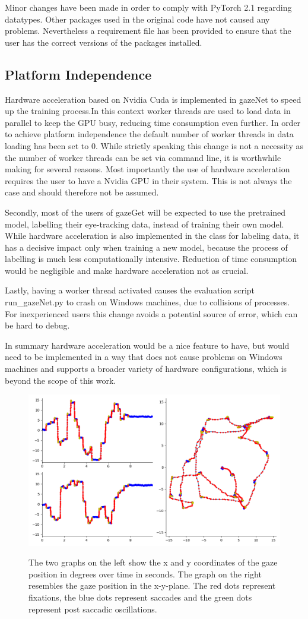 \documentclass[conference]{IEEEtran}
\begin{document}
Minor changes have been made in order to comply with PyTorch 2.1 regarding datatypes. Other packages used in the original code have not caused any problems. Nevertheless a requirement file has been provided to ensure that the user has the correct versions of the packages installed.

\subsection{Platform Independence}
Hardware acceleration based on Nvidia Cuda is implemented in gazeNet to speed up the training process.In this context worker threads are used to load data in parallel to keep the GPU busy, reducing time consumption even further. In order to achieve platform independence the default number of worker threads in data loading has been set to 0. While strictly speaking this change is not a necessity as the number of worker threads can be set via command line, it is worthwhile making for several reasons. Most importantly the use of hardware acceleration requires the user to have a Nvidia GPU in their system. This is not always the case and should therefore not be assumed.

Secondly, most of the users of gazeGet will be expected to use the pretrained model, labelling their eye-tracking data, instead of training their own model. While hardware acceleration is also implemented in the class for labeling data, it has a decisive impact only when training a new model, because the process of labelling is much less computationally intensive. Reduction of time consumption would be negligible and make hardware acceleration not as crucial.

Lastly, having a worker thread activated causes the evaluation script run\_gazeNet.py to crash on Windows machines, due to collisions of processes. For inexperienced users this change avoids a potential source of error, which can be hard to debug.

In summary hardware acceleration would be a nice feature to have, but would need to be implemented in a way that does not cause problems on Windows machines and supports a broader variety of hardware configurations, which is beyond the scope of this work.

\begin{figure}
    \centering
    \includegraphics[width=0.6\linewidth]
    {TH34_img_Europe_labelled_MN}
    \label{fig:lund2013}
    \caption{The two graphs on the left show the x and y coordinates of the gaze position in degrees over time in seconds. The graph on the right resembles the gaze position in the x-y-plane. The red dots represent fixations, the blue dots represent saccades and the green dots represent post saccadic oscillations.}
\end{figure}
\end{document}
